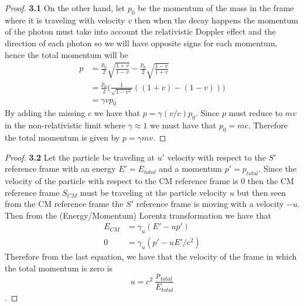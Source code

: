 \documentclass[11pt]{article}
\theoremstyle{definition}
\begin{document}
\begin{proof}{\textbf{3.1}}
    On the other hand, let $p_0$ be the momentum of the mass in the frame
    where it is traveling with velocity $v$ then when the decay happens
    the momentum of the photon must take into account the relativistic
    Doppler effect and the direction of each photon so we will have 
    opposite signs for each momentum, hence the total momentum will be
    \begin{align*}
        p &= \frac{p_0}{2}\sqrt{\frac{1+ v}{1-v}}
        - \frac{p_0}{2}\sqrt{\frac{1 - v}{1 + v}}\\
            &= \frac{p_0}{2}\bigg(\frac{1}
            {\sqrt{1 - v^2}}((1 + v) - (1 - v))\bigg)\\
            &= \gamma v p_0
    \end{align*}
    By adding the missing $c$ we have that $p = \gamma(v/c)p_0$.
    Since $p$ must reduce to $mv$ in the non-relativistic limit where
    $\gamma \approx 1$ we must have that $p_0 = mc$. Therefore the total
    momentum is given by $p = \gamma mv$.
\end{proof}
\begin{proof}{\textbf{3.2}}
    Let the particle be traveling at $u'$ velocity with respect to the $S'$
    reference frame with an energy $E' = E_{total}$ and a momentum
    $p' = p_{total}$. Since the velocity of the particle with respect to the
    CM reference frame is 0 then the CM reference frame $S_{CM}$ must be
    traveling at the particle velocity $u$ but then seen from the CM reference
    frame the $S'$ reference frame is moving with a velocity $-u$.    
    Then from the (Energy/Momentum) Lorentz transformation we have that
    \begin{align*}
        E_{CM} &= \gamma_u(E' - up')\\
        0 &= \gamma_u(p' - uE'/c^2)
    \end{align*}
    Therefore from the last equation, we have that the velocity of the frame in
    which the total momentum is zero is
    $$u = c^2~\frac{p_{total}}{E_{total}}$$. 
\end{proof}
\cleardoublepage
\end{document}
